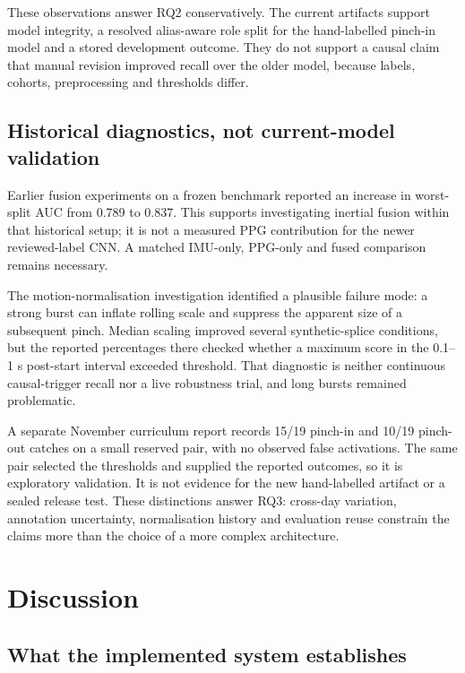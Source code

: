 These observations answer RQ2 conservatively. The current artifacts support model integrity, a resolved alias-aware role split for the hand-labelled pinch-in model and a stored development outcome. They do not support a causal claim that manual revision improved recall over the older model, because labels, cohorts, preprocessing and thresholds differ.

\subsection{Historical diagnostics, not current-model validation}\label{historical-diagnostics-not-current-model-validation}

Earlier fusion experiments on a frozen benchmark reported an increase in worst-split AUC from 0.789 to 0.837. This supports investigating inertial fusion within that historical setup; it is not a measured PPG contribution for the newer reviewed-label CNN. A matched IMU-only, PPG-only and fused comparison remains necessary.

The motion-normalisation investigation identified a plausible failure mode: a strong burst can inflate rolling scale and suppress the apparent size of a subsequent pinch. Median scaling improved several synthetic-splice conditions, but the reported percentages there checked whether a maximum score in the 0.1--1 s post-start interval exceeded threshold. That diagnostic is neither continuous causal-trigger recall nor a live robustness trial, and long bursts remained problematic.

A separate November curriculum report records 15/19 pinch-in and 10/19 pinch-out catches on a small reserved pair, with no observed false activations. The same pair selected the thresholds and supplied the reported outcomes, so it is exploratory validation. It is not evidence for the new hand-labelled artifact or a sealed release test. These distinctions answer RQ3: cross-day variation, annotation uncertainty, normalisation history and evaluation reuse constrain the claims more than the choice of a more complex architecture.

\section{Discussion}\label{discussion}

\subsection{What the implemented system establishes}\label{what-the-implemented-system-establishes}

